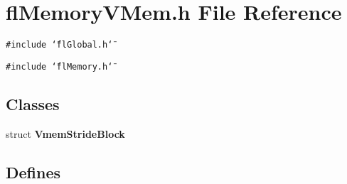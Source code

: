 \section{fl\-Memory\-VMem.h File Reference}
\label{flMemoryVMem_8h}
{\tt \#include \char`\"{}fl\-Global.h\char`\"{}}\par
{\tt \#include \char`\"{}fl\-Memory.h\char`\"{}}\par
\subsection*{Classes}
\begin{CompactItemize}
\item 
struct {\bf Vmem\-Stride\-Block}
\end{CompactItemize}
\subsection*{Defines}
